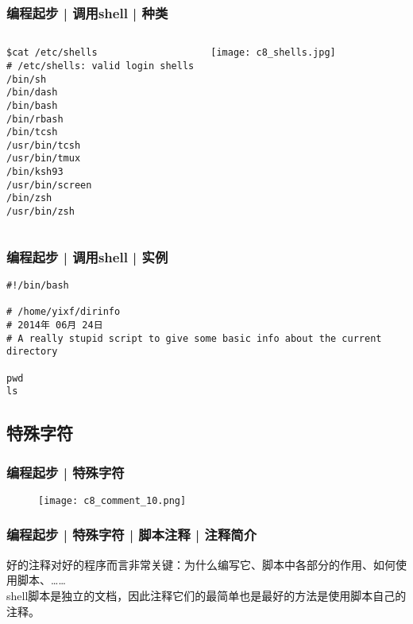 \begin{frame}[fragile]
  \frametitle{编程起步 | 调用shell | 种类}
  \begin{columns}
\begin{lstlisting}
$cat /etc/shells
# /etc/shells: valid login shells
/bin/sh
/bin/dash
/bin/bash
/bin/rbash
/bin/tcsh
/usr/bin/tcsh
/usr/bin/tmux
/bin/ksh93
/usr/bin/screen
/bin/zsh
/usr/bin/zsh
\end{lstlisting}
    \texttt{[image: c8\_shells.jpg]}
  \end{columns}
\end{frame}

\begin{frame}[fragile]
  \frametitle{编程起步 | 调用shell | 实例}
\begin{lstlisting}
#!/bin/bash

# /home/yixf/dirinfo
# 2014年 06月 24日
# A really stupid script to give some basic info about the current directory

pwd
ls
\end{lstlisting}
\end{frame}

\subsection{特殊字符}
\begin{frame}
  \frametitle{编程起步 | \alert{特殊字符}}
  \begin{figure}
    \centering
    \texttt{[image: c8\_comment\_10.png]}
  \end{figure}
\end{frame}

\begin{frame}
  \frametitle{编程起步 | 特殊字符 | 脚本注释 | 注释简介}
  好的注释对好的程序而言非常关键：为什么编写它、脚本中各部分的作用、如何使用脚本、……\\
  \vspace{0.5em}
  shell脚本是独立的文档，因此注释它们的最简单也是最好的方法是使用脚本自己的注释。
\end{frame}

